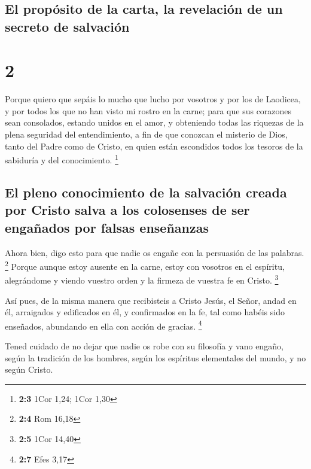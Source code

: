 \hypertarget{el-propuxf3sito-de-la-carta-la-revelaciuxf3n-de-un-secreto-de-salvaciuxf3n}{%
\subsection{El propósito de la carta, la revelación de un secreto de
salvación}\label{el-propuxf3sito-de-la-carta-la-revelaciuxf3n-de-un-secreto-de-salvaciuxf3n}}

\hypertarget{section-1}{%
\section{2}\label{section-1}}

 Porque quiero que sepáis lo mucho que lucho por vosotros
y por los de Laodicea, y por todos los que no han visto mi rostro en la
carne;  para que sus corazones sean consolados, estando
unidos en el amor, y obteniendo todas las riquezas de la plena seguridad
del entendimiento, a fin de que conozcan el misterio de Dios, tanto del
Padre como de Cristo,  en quien están escondidos todos los
tesoros de la sabiduría y del conocimiento. \footnote{\textbf{2:3} 1Cor
  1,24; 1Cor 1,30}

\hypertarget{el-pleno-conocimiento-de-la-salvaciuxf3n-creada-por-cristo-salva-a-los-colosenses-de-ser-engauxf1ados-por-falsas-enseuxf1anzas}{%
\subsection{El pleno conocimiento de la salvación creada por Cristo
salva a los colosenses de ser engañados por falsas
enseñanzas}\label{el-pleno-conocimiento-de-la-salvaciuxf3n-creada-por-cristo-salva-a-los-colosenses-de-ser-engauxf1ados-por-falsas-enseuxf1anzas}}

 Ahora bien, digo esto para que nadie os engañe con la
persuasión de las palabras. \footnote{\textbf{2:4} Rom 16,18}
 Porque aunque estoy ausente en la carne, estoy con
vosotros en el espíritu, alegrándome y viendo vuestro orden y la firmeza
de vuestra fe en Cristo. \footnote{\textbf{2:5} 1Cor 14,40}

 Así pues, de la misma manera que recibisteis a Cristo
Jesús, el Señor, andad en él,  arraigados y edificados en
él, y confirmados en la fe, tal como habéis sido enseñados, abundando en
ella con acción de gracias. \footnote{\textbf{2:7} Efes 3,17}

 Tened cuidado de no dejar que nadie os robe con su
filosofía y vano engaño, según la tradición de los hombres, según los
espíritus elementales del mundo, y no según Cristo.

